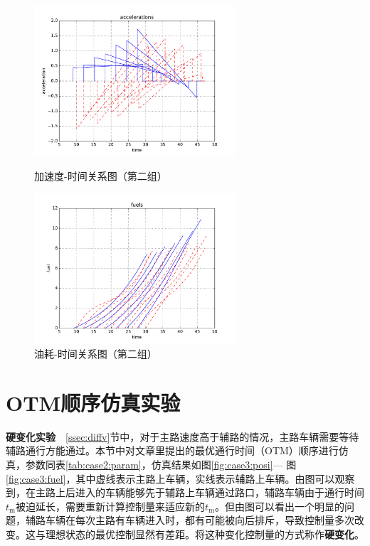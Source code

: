 \begin{figure}[htbp]
\begin{minipage}{0.48\textwidth}
  \centering
  \includegraphics[height=5.6cm]{figures/sim_case2/acc.pdf}
  \caption{加速度-时间关系图（第二组）}
  \label{fig:case2:acc}
\end{minipage}\hfill
\begin{minipage}{0.48\textwidth}
  \centering
  \includegraphics[height=5.6cm]{figures/sim_case2/fuel.pdf}
  \caption{油耗-时间关系图（第二组）}
  \label{fig:case2:fuel}
\end{minipage}
\end{figure}


\section{OTM顺序仿真实验}
\textbf{硬变化实验}\ \
\ref{ssec:diffv}节中，对于主路速度高于辅路的情况，主路车辆需要等待辅路通行方能通过。本节中对文章里提出的最优通行时间（OTM）顺序进行仿真，参数同表\ref{tab:case2:param}，仿真结果如图\ref{fig:case3:posi}--- 图\ref{fig:case3:fuel}，其中虚线表示主路上车辆，实线表示辅路上车辆。由图可以观察到，在主路上后进入的车辆能够先于辅路上车辆通过路口，辅路车辆由于通行时间$t_\mathrm{m}$被迫延长，需要重新计算控制量来适应新的$t_\mathrm{m}$。但由图可以看出一个明显的问题，辅路车辆在每次主路有车辆进入时，都有可能被向后排斥，导致控制量多次改变。这与理想状态的最优控制显然有差距。将这种变化控制量的方式称作\textbf{硬变化}。

